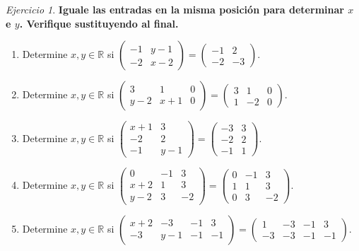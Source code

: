 \documentclass[12pt]{article}
\theoremstyle{remark}
\newtheorem{Ejer}[definicion]{Ejercicio}
\begin{document}
\begin{Ejer}
\textbf{Iguale las entradas en la misma posición para determinar $x$ e $y$. Verifique sustituyendo al final.}
\begin{enumerate}[resume=banco]

\item Determine $x,y\in\mathbb R$ si $\begin{pmatrix}-1&y - 1\\-2&x - 2\end{pmatrix}=\begin{pmatrix}-1&2\\-2&-3\end{pmatrix}$.

\item Determine $x,y\in\mathbb R$ si $\begin{pmatrix}3&1&0\\y - 2&x + 1&0\end{pmatrix}=\begin{pmatrix}3&1&0\\1&-2&0\end{pmatrix}$.

\item Determine $x,y\in\mathbb R$ si $\begin{pmatrix}x + 1&3\\-2&2\\-1&y - 1\end{pmatrix}=\begin{pmatrix}-3&3\\-2&2\\-1&1\end{pmatrix}$.

\item Determine $x,y\in\mathbb R$ si $\begin{pmatrix}0&-1&3\\x + 2&1&3\\y - 2&3&-2\end{pmatrix}=\begin{pmatrix}0&-1&3\\1&1&3\\0&3&-2\end{pmatrix}$.

\item Determine $x,y\in\mathbb R$ si $\begin{pmatrix}x + 2&-3&-1&3\\-3&y - 1&-1&-1\end{pmatrix}=\begin{pmatrix}1&-3&-1&3\\-3&-3&-1&-1\end{pmatrix}$.


\end{enumerate}
\end{Ejer}
\end{document}

